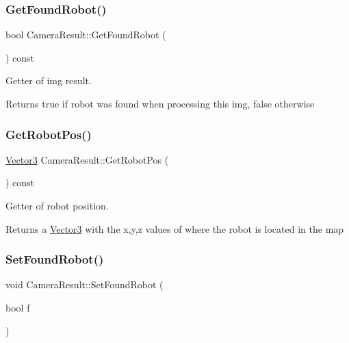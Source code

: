 \subsubsection{\texorpdfstring{Get\+Found\+Robot()}{GetFoundRobot()}}
{\footnotesize\ttfamily bool Camera\+Result\+::\+Get\+Found\+Robot (\begin{DoxyParamCaption}{ }\end{DoxyParamCaption}) const}



Getter of img result. 

\begin{DoxyReturn}{Returns}
true if robot was found when processing this img, false otherwise 
\end{DoxyReturn}
\mbox{\label{classCameraResult_a12314f7a760e9eaa5fd949afc3289d54}} 
\subsubsection{\texorpdfstring{Get\+Robot\+Pos()}{GetRobotPos()}}
{\footnotesize\ttfamily \hyperlink{classVector3}{Vector3} Camera\+Result\+::\+Get\+Robot\+Pos (\begin{DoxyParamCaption}{ }\end{DoxyParamCaption}) const}



Getter of robot position. 

\begin{DoxyReturn}{Returns}
a \hyperlink{classVector3}{Vector3} with the x,y,z values of where the robot is located in the map 
\end{DoxyReturn}
\mbox{\label{classCameraResult_a764f0b2b6fa57734ebf45703c79e071c}} 
\subsubsection{\texorpdfstring{Set\+Found\+Robot()}{SetFoundRobot()}\hspace{0.1cm}{\footnotesize\ttfamily [1/2]}}
{\footnotesize\ttfamily void Camera\+Result\+::\+Set\+Found\+Robot (\begin{DoxyParamCaption}\item[{bool}]{f }\end{DoxyParamCaption})}



